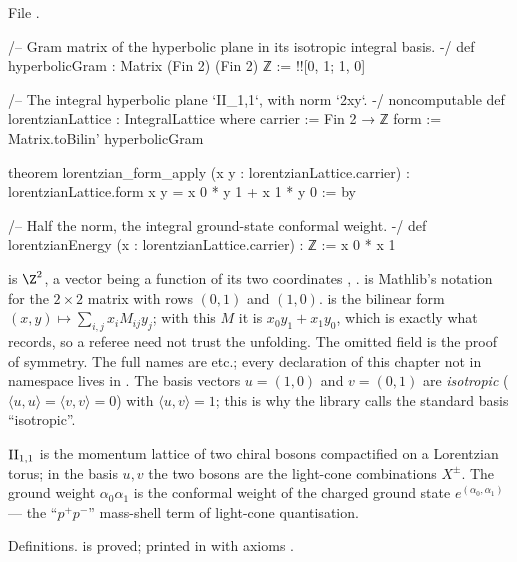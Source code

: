 \noindent File .
\begin{leancode}
/-- Gram matrix of the hyperbolic plane in its isotropic integral basis. -/
def hyperbolicGram : Matrix (Fin 2) (Fin 2) ℤ := !![0, 1; 1, 0]

/-- The integral hyperbolic plane `II_{1,1}`, with norm `2xy`. -/
noncomputable def lorentzianLattice : IntegralLattice where
  carrier := Fin 2 → ℤ
  form := Matrix.toBilin' hyperbolicGram

theorem lorentzian_form_apply (x y : lorentzianLattice.carrier) :
    lorentzianLattice.form x y = x 0 * y 1 + x 1 * y 0 := by

/-- Half the norm, the integral ground-state conformal weight. -/
def lorentzianEnergy (x : lorentzianLattice.carrier) : ℤ := x 0 * x 1
\end{leancode}

\begin{dictionary}
 is $\Z^2$, a vector being a function of its two coordinates , .
\chseventeenL{!![0, 1; 1, 0]} is Mathlib's notation for the $2\times2$ matrix with rows $(0,1)$ and $(1,0)$.
 is the bilinear form $(x,y)\mapsto\sum_{i,j}x_iM_{ij}y_j$; with this $M$ it is
$x_0y_1+x_1y_0$, which is exactly what  records, so a referee need not trust
the unfolding.  The omitted field  is the proof of symmetry.  The full names are
 etc.; every declaration of this chapter not in
namespace  lives in .  The basis vectors $u=(1,0)$ and
$v=(0,1)$ are \emph{isotropic} ($\langle u,u\rangle=\langle v,v\rangle=0$) with $\langle u,v\rangle=1$; this is
why the library calls the standard basis ``isotropic''.
\end{dictionary}

\begin{physics}
${\mathrm{II}_{1,1}}$ is the momentum lattice of two chiral bosons compactified on a Lorentzian torus; in the
basis $u,v$ the two bosons are the light-cone combinations $X^\pm$.  The ground weight $\alpha_0\alpha_1$ is the conformal
weight of the charged ground state $e^{(\alpha_0,\alpha_1)}$ --- the ``$p^+p^-$'' mass-shell term of light-cone
quantisation.
\end{physics}

\begin{status}
Definitions.   is proved; printed in
 with axioms .
\end{status}

